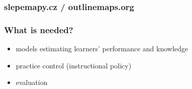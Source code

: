 \documentclass[xcolor=svgnames]{beamer}
\begin{document}
\begin{frame}
	\frametitle{slepemapy.cz / outlinemaps.org}
	\begin{center}
	\end{center}
\end{frame}
\begin{frame}
	\frametitle{What is needed?}
	\begin{itemize}
		\item models estimating learners' performance and knowledge
		\item practice control (instructional policy)
		\item evaluation
	\end{itemize}
\end{frame}
\end{document}

